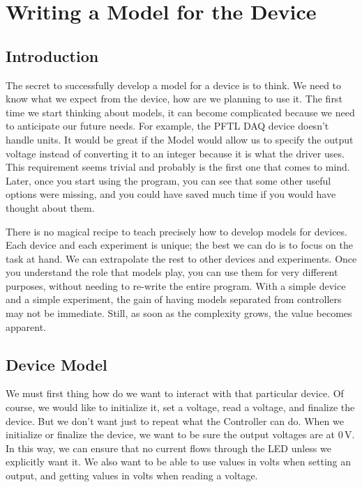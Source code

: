 \chapter{Writing a Model for the Device}\label{ch:device-model}

\section{Introduction}\label{sec:device-model-introduction}
The secret to successfully develop a model for a device is to think. We need to know what we expect from the device, how are we planning to use it. The first time we start thinking about models, it can become complicated because we need to anticipate our future needs. For example, the {PFTL DAQ} device doesn't handle units. It would be great if the Model would allow us to specify the output voltage instead of converting it to an integer because it is what the driver uses. This requirement seems trivial and probably is the first one that comes to mind. Later, once you start using the program, you can see that some other useful options were missing, and you could have saved much time if you would have thought about them.

There is no magical recipe to teach precisely how to develop models for devices. Each device and each experiment is unique; the best we can do is to focus on the task at hand. We can extrapolate the rest to other devices and experiments. Once you understand the role that models play, you can use them for very different purposes, without needing to re-write the entire program. With a simple device and a simple experiment, the gain of having models separated from controllers may not be immediate. Still, as soon as the complexity grows, the value becomes apparent.


\section{Device Model}\label{sec:device-model}
We must first thing how do we want to interact with that particular device. Of course, we would like to initialize it, set a voltage, read a voltage, and finalize the device. But we don't want just to repeat what the Controller can do. When we initialize or finalize the device, we want to be sure the output voltages are at $0\,\textrm{V}$. In this way, we can ensure that no current flows through the LED unless we explicitly want it. We also want to be able to use values in volts when setting an output, and getting values in volts when reading a voltage.

